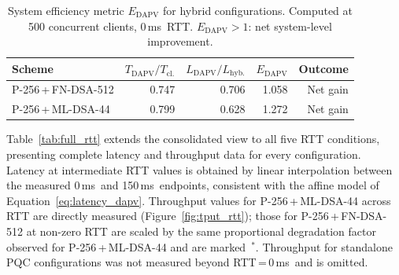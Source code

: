 \documentclass[preprint,10pt,3p]{elsarticle}
\newcommand{\ms}{\,ms}
\begin{document}
\begin{table}[htbp]
\centering
\caption{System efficiency metric $E_\text{DAPV}$ for hybrid configurations.
  Computed at 500 concurrent clients, 0\ms\ RTT.
  $E_\text{DAPV} > 1$: net system-level improvement.}
\label{tab:efficiency}
\small
\begin{tabular}{lrrrr}
\toprule
\textbf{Scheme} &
  $T_\text{DAPV}/T_\text{cl.}$ &
  $L_\text{DAPV}/L_\text{hyb.}$ &
  $E_\text{DAPV}$ & \textbf{Outcome} \\
\midrule
P-256\,+\,FN-DSA-512 & 0.747 & 0.706 & 1.058 & Net gain \\
P-256\,+\,ML-DSA-44  & 0.799 & 0.628 & 1.272 & Net gain \\
\bottomrule
\end{tabular}
\end{table}

Table~\ref{tab:full_rtt} extends the consolidated view to all five RTT
conditions, presenting complete latency and throughput data for every
configuration.  Latency at intermediate RTT values is obtained by linear
interpolation between the measured 0\ms\ and 150\ms\ endpoints, consistent
with the affine model of Equation~\eqref{eq:latency_dapv}.  Throughput values
for P-256\,+\,ML-DSA-44 across RTT are directly measured
(Figure~\ref{fig:tput_rtt}); those for P-256\,+\,FN-DSA-512 at non-zero RTT
are scaled by the same proportional degradation factor observed for
P-256\,+\,ML-DSA-44 and are marked~$^*$.  Throughput for standalone PQC
configurations was not measured beyond RTT\,=\,0\ms\ and is omitted.
\end{document}

